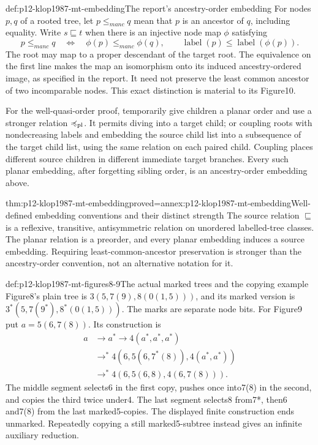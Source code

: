 \begin{hbdefinition}{def:p12-klop1987-mt-embedding}{The report's ancestry-order embedding}
For nodes \(p,q\) of a rooted tree, let \(p\leq_{
m anc}q\)
mean that \(p\) is an ancestor of \(q\), including equality.
Write \(s\sqsubseteq t\) when there is an injective node map
\(\phi\) satisfying
\[
 p\leq_{
m anc}q\quad\Longleftrightarrow\quad
 \phi(p)\leq_{
m anc}\phi(q),\qquad
 \operatorname{label}(p)\leq\operatorname{label}(\phi(p)).
\]
The root may map to a proper descendant of the target root.
The equivalence on the first line makes the map an isomorphism onto
its induced ancestry-ordered image, as specified in the report.
It need not preserve the least common ancestor of two incomparable
nodes. This exact distinction is material to its Figure10.

For the well-quasi-order proof, temporarily give children a planar
order and use a stronger relation \(\preccurlyeq_{\rm pl}\).
It permits diving into a target child; or coupling roots with
nondecreasing labels and embedding the source child list into a
subsequence of the target child list, using the same relation on
each paired child. Coupling places different source children in
different immediate target branches. Every such planar embedding,
after forgetting sibling order, is an ancestry-order embedding above.
\end{hbdefinition}

\begin{hblemma}{thm:p12-klop1987-mt-embedding}{proved=annex:p12-klop1987-mt-embedding}{Well-defined embedding conventions and their distinct strength}
The source relation \(\sqsubseteq\) is a reflexive, transitive,
antisymmetric relation on unordered labelled-tree classes. The planar
relation is a preorder, and every planar embedding induces a source
embedding. Requiring least-common-ancestor preservation is stronger
than the ancestry-order convention, not an alternative notation for it.
\end{hblemma}

\begin{hbexample}{def:p12-klop1987-mt-figures8-9}{The actual marked trees and the copying example}
Figure8's plain tree is \(3(5,7(9),8(0(1,5)))\), and its marked
version is \(3^*(5,7(9^*),8^*(0(1,5)))\). The marks are separate
node bits. For Figure9 put \(a=5(6,7(8))\). Its construction is
\begin{align*}
 a&\to a^*\to4(a^*,a^*,a^*)\\
 &\to^*4(6,5(6,7^*(8)),4(a^*,a^*))\\
 &\to^*4(6,5(6,8),4(6,7(8))).
\end{align*}
The middle segment selects6 in the first copy, pushes once into7(8)
in the second, and copies the third twice under4. The last segment
selects8 from7*, then6 and7(8) from the last marked5-copies.
The displayed finite construction ends unmarked. Repeatedly copying
a still marked5-subtree instead gives an infinite auxiliary reduction.
\end{hbexample}

